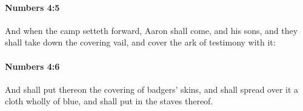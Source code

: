 		\paragraph{Numbers 4:5} %
			\label{NUMBERS-4-5}

			And when the camp setteth forward, Aaron shall come, and his sons, and they shall take down the covering vail, and cover the ark of testimony with it:


		\paragraph{Numbers 4:6} %
			\label{NUMBERS-4-6}

			And shall put thereon the covering of badgers’ skins, and shall spread over it a cloth wholly of blue, and shall put in the staves thereof.


